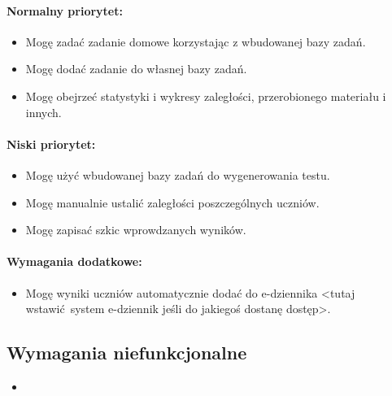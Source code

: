 \documentclass[polish,12pt]{aghthesis}
\begin{document}
\paragraph{Normalny priorytet:}
\begin{itemize}
	\item{Mogę zadać zadanie domowe korzystając z wbudowanej bazy zadań.}
	\item{Mogę dodać zadanie do własnej bazy zadań.}
	\item{Mogę obejrzeć statystyki i wykresy zaległości, przerobionego materiału i innych.} 
\end{itemize}

\paragraph{Niski priorytet:}
\begin{itemize}
	\item{Mogę użyć wbudowanej bazy zadań do wygenerowania testu.}
	\item{Mogę manualnie ustalić zaległości poszczególnych uczniów.}
	\item{Mogę zapisać szkic wprowdzanych wyników.}
\end{itemize}

\paragraph{Wymagania dodatkowe:}
\begin{itemize}
	\item{Mogę wyniki uczniów automatycznie dodać do e-dziennika <tutaj wstawić system e-dziennik jeśli do jakiegoś dostanę dostęp>.}
\end{itemize}

\subsection{Wymagania niefunkcjonalne}

\begin{itemize}
	\item{}
\end{itemize}


\section{\SectionTitleRealizationAspects}
\label{sec:wybrane-aspekty-realizacji}
\end{document}
